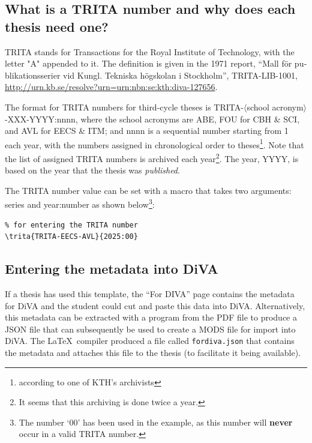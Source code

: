 \documentclass[12pt, twoside]{article}
\newcommand{\fname}[1]{\texttt{#1}}
\begin{document}
\FloatBarrier
{}
\subsection{What is a TRITA number and why does each thesis need one?}
\label{sec:addingTriTANumberToPorject}
TRITA stands for Transactions for the Royal Institute of Technology, with the letter "A" appended to it. The definition is given in the 1971 report, \enquote{\foreignlanguage{swedish}{Mall för publikationsserier vid Kungl. Tekniska högskolan i Stockholm}}, TRITA-LIB-1001, \url{http://urn.kb.se/resolve?urn=urn:nbn:se:kth:diva-127656}.

The format for TRITA numbers for third-cycle theses is TRITA-$\langle$school acronym$\rangle$-XXX-YYYY:nnnn, where the school acronyms are ABE, FOU for CBH \& SCI, and AVL for EECS \& ITM; and 
nnnn is a sequential number starting from 1 each year, with the numbers assigned in chronological order to theses\footnote{according to one of \gls{KTH}'s archivists}. Note that the list of assigned TRITA numbers is archived each year\footnote{It seems that this archiving is done twice a year.}. The year, YYYY, is based on the year that the thesis was \emph{published}.

The TRITA number value can be set with a macro that takes two arguments: series and year:number as shown below\footnote{The number `00' has been used in the example, as this number will \textbf{never} occur in a valid TRITA number.}:
\begin{lstlisting}
% for entering the TRITA number
\trita{TRITA-EECS-AVL}{2025:00}  
\end{lstlisting}


\subsection{Entering the metadata into DiVA}
\label{sec:enteringMetaData}
If a thesis has used this template, the \enquote{For DIVA} page contains the metadata for \gls{DiVA} and the student could cut and paste this data into \gls{DiVA}. Alternatively, this metadata can be extracted with a program from the \gls{PDF} file to produce a \gls{JSON} file that can subsequently be used to create a \gls{MODS} file for import into \gls{DiVA}. The \LaTeX\  compiler produced a file called \fname{fordiva.json} that contains the metadata and attaches this file to the thesis (to facilitate it being available).
\end{document}
